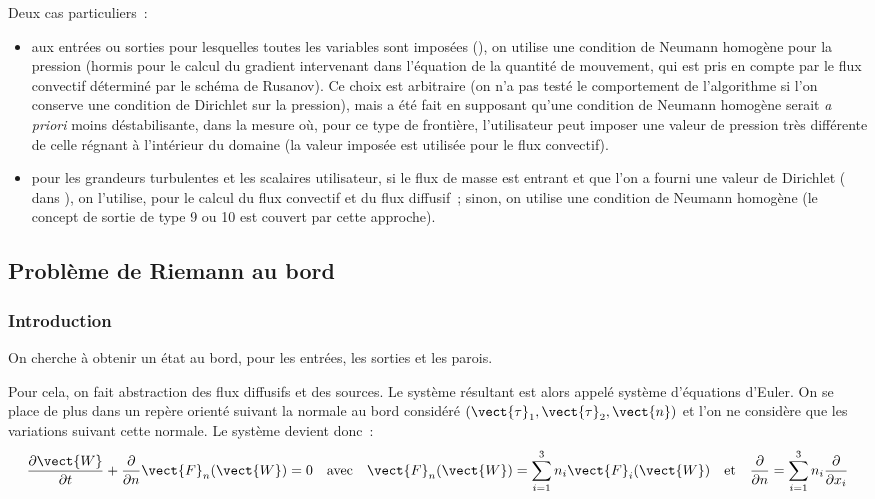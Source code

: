 Deux cas particuliers~:
\begin{itemize}
\item aux entr\'ees ou sorties pour lesquelles toutes les variables sont impos\'ees
(), on utilise une condition de Neumann homog\`ene pour la pression
(hormis pour le calcul du gradient intervenant dans l'\'equation de la quantit\'e
de mouvement, qui est pris en compte par le flux convectif d\'etermin\'e par le
sch\'ema de Rusanov). Ce choix est arbitraire (on n'a pas test\'e le comportement
de l'algorithme si l'on conserve une condition de Dirichlet sur la pression), mais
a \'et\'e fait en supposant qu'une condition de Neumann homog\`ene serait {\it a
priori} moins d\'estabilisante, dans la mesure o\`u, pour ce type de fronti\`ere,
l'utilisateur peut imposer une valeur de pression tr\`es diff\'erente de
celle r\'egnant \`a l'int\'erieur du domaine (la valeur impos\'ee est utilis\'ee
pour le flux convectif).
\item pour les grandeurs turbulentes et les scalaires utilisateur, si
le flux de masse est entrant et que l'on a fourni
une valeur de Dirichlet ( dans ),
on l'utilise, pour le calcul du flux convectif et du flux diffusif~;
sinon, on utilise une condition de Neumann homog\`ene (le concept
de sortie de type 9 ou 10 est couvert par cette approche).
\end{itemize}



\subsection*{Probl\`eme de Riemann au bord}
\label{Cfbl_Cfxtcl_section_pb_riemann_cfener}

\subsubsection*{Introduction}

On cherche \`a obtenir un \'etat au bord,
pour les entr\'ees, les sorties et les parois.

Pour cela, on fait abstraction des flux diffusifs et des sources.
Le syst\`eme r\'esultant est alors appel\'e syst\`eme
d'\'equations d'Euler. On se place de plus dans un
rep\`ere orient\'e suivant la normale au bord consid\'er\'e
$(\vect{\tau}_1,\vect{\tau}_2,\vect{n})$
et l'on ne consid\`ere que les variations suivant cette normale.
Le syst\`eme devient donc~:
\begin{equation}\label{Cfbl_Cfxtcl_eq_euler_cfxtcl}
\begin{array}{lllll}
\displaystyle\frac{\partial \vect{W}}{\partial t}
+ \frac{\partial}{\partial n}\vect{F}_n(\vect{W})
= 0
&\text{avec}
& \vect{F}_n(\vect{W})
 = \displaystyle\sum\limits_{i=1}^3 n_i \vect{F}_i(\vect{W})
& \text{et}
& \displaystyle\frac{\partial}{\partial n}
= \displaystyle\sum\limits_{i=1}^3 n_i \frac{\partial}{\partial x_i}
\end{array}
\end{equation}

